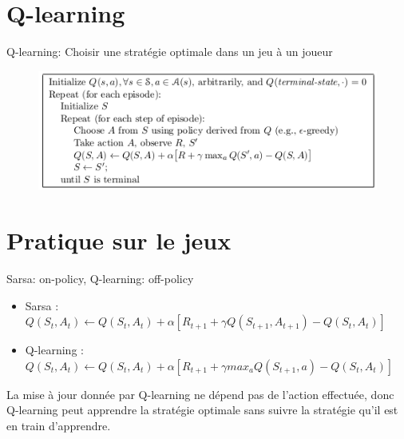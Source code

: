 \documentclass{beamer}	%
\theoremstyle{plain}
\theoremstyle{definition}
\theoremstyle{remark}
\numberwithin{equation}{section}
\begin{document}
\section{Q-learning}
\begin{frame}

Q-learning: Choisir une stratégie optimale dans un jeu à un joueur

\begin{figure}
\begin{minipage}[t]{1\linewidth}
\centering
\includegraphics[width=0.80 \textwidth,height=0.6\textheight]{photo/Q.png}
\label{fig:side:a}
\end{minipage}%

\end{figure}
\end{frame}


\section{Pratique sur le jeux}

\begin{frame}
Sarsa: on-policy, Q-learning: off-policy
\begin{itemize}
\item Sarsa :
$Q(S_t, A_t) \leftarrow Q(S_t, A_t) + \alpha[R_{t+1} + \gamma Q(S_{t+1}, A_{t+1})-Q(S_t, A_t)]$
\end{itemize}

\vspace{0.5cm}

\begin{itemize}
\item Q-learning :
$Q(S_t, A_t) \leftarrow Q(S_t, A_t) + \alpha[R_{t+1} + \gamma max_a Q(S_{t+1}, a)-Q(S_t, A_t)]$
\end{itemize}

\vspace{1.0cm}


La mise à jour donnée par Q-learning ne dépend pas de l'action effectuée, donc Q-learning peut apprendre la stratégie optimale sans suivre la stratégie qu'il est en train d'apprendre.
\end{frame}
\end{document}
